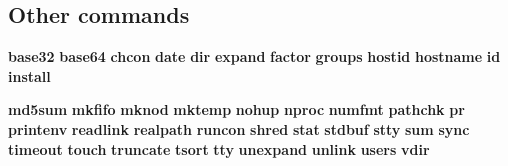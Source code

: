 \subsection{Other commands}
\textbf{base32} \textbf{base64}
\textbf{chcon}
\textbf{date} \textbf{dir}
\textbf{expand}
\textbf{factor}
\textbf{groups}
\textbf{hostid} \textbf{hostname}
\textbf{id} \textbf{install}

\textbf{md5sum} \textbf{mkfifo} \textbf{mknod} \textbf{mktemp}
\textbf{nohup} \textbf{nproc} \textbf{numfmt}
\textbf{pathchk} \textbf{pr} \textbf{printenv}
\textbf{readlink} \textbf{realpath} \textbf{runcon}
\textbf{shred} \textbf{stat} \textbf{stdbuf} \textbf{stty} \textbf{sum} \textbf{sync}
\textbf{timeout} \textbf{touch} \textbf{truncate} \textbf{tsort} \textbf{tty}
\textbf{unexpand} \textbf{unlink} \textbf{users}
\textbf{vdir} 